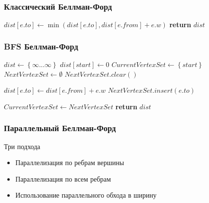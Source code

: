 \documentclass[10pt, compress]{beamer}
\begin{document}
\begin{frame}[fragile]
  \frametitle{Классический Беллман-Форд}
\begin{algorithm}[H]
\begin{algorithmic}[1]
 
		\State $dist[e.to] \gets \min(dist[e.to], dist[e.from] + e.w)$
	\EndFor
\EndFor
\State \textbf{return} $dist$
\EndProcedure
\end{algorithmic}
\end{algorithm}
\end{frame}

\begin{frame}[fragile]
  \frametitle{BFS Беллман-Форд}
\begin{algorithm}[H]
\begin{algorithmic}[1]

\State $dist\gets \left\{ {\infty ... \infty}\right\}$
\State $dist[start] \gets 0$
\State $CurrentVertexSet \gets \left\{ {start}\right\}$
\State $NextVertexSet \gets \emptyset$ 
	\State $NextVertexSet.clear()$
	
				\State $dist[e.to] \gets dist[e.from] + e.w$
				\State $NextVertexSet.insert(e.to)$								
			\EndIf
		\EndFor
	\EndFor
	
	\State $CurrentVertexSet \gets NextVertexSet$	
\EndWhile
\State \textbf{return} $dist$

\EndProcedure



\end{algorithmic}
\end{algorithm}
\end{frame}

\begin{frame}[fragile]
  \frametitle{Параллельный Беллман-Форд}
  Три подхода
  \begin{itemize}
    \item Параллелизация по ребрам вершины
    \item Параллелизация по всем ребрам
    \item Использование параллельного обхода в ширину
  \end{itemize}
\end{frame}
\end{document}
